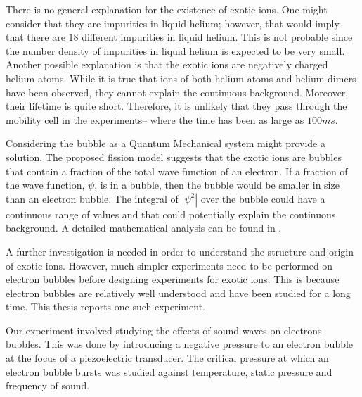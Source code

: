 There is no general explanation for the existence of exotic ions. One might consider that they are impurities in liquid helium; however, that would imply that there are 18 different impurities in liquid helium. This is not probable since the number density of impurities in liquid helium is expected to be very small. Another possible explanation is that the exotic ions are negatively charged helium atoms. While it is true that ions of both helium atoms and helium dimers have been observed, they cannot explain the continuous background. Moreover, their lifetime is quite short. Therefore, it is unlikely that they pass through the mobility cell in the experiments-- where the time has been as large as $100 ms$.

Considering the bubble as a Quantum Mechanical system might provide a solution. The proposed fission model suggests that the exotic ions are bubbles that contain a fraction of the total wave function of an electron. If a fraction of the wave function, $\psi$, is in a bubble, then the bubble would be smaller in size than an electron bubble. The integral of $|\psi^2|$ over the bubble could have a continuous range of values and that could potentially explain the continuous background. A detailed mathematical analysis can be found in \cite{Wei2016}.

A further investigation is needed in order to understand the structure and origin of exotic ions. However, much simpler experiments need to be performed on electron bubbles before designing experiments for exotic ions. This is because electron bubbles are relatively well understood and have been studied for a long time. This thesis reports one such experiment.

Our experiment involved studying the effects of sound waves on electrons bubbles. This was done by introducing a negative pressure to an electron bubble at the focus of a piezoelectric transducer. The critical pressure at which an electron bubble bursts was studied against temperature, static pressure and frequency of sound.